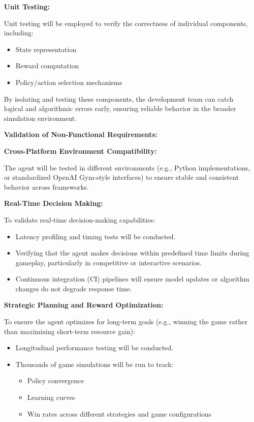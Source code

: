 \documentclass{article}
\begin{document}
\vspace{1em}

\noindent\textbf{Unit Testing:}

Unit testing will be employed to verify the correctness of individual components, including:
\begin{itemize}
    \item State representation
    \item Reward computation
    \item Policy/action selection mechanisms
\end{itemize}

By isolating and testing these components, the development team can catch logical and algorithmic errors early, ensuring reliable behavior in the broader simulation environment.

\noindent\textbf{Validation of Non-Functional Requirements:}

\noindent\textbf{Cross-Platform Environment Compatibility:}

The agent will be tested in different \emph{\Catan{}} environments (e.g., Python implementations, or standardized OpenAI Gym-style interfaces) to ensure stable and consistent behavior across frameworks.

\noindent\textbf{Real-Time Decision Making:}

To validate real-time decision-making capabilities:
\begin{itemize}
    \item Latency profiling and timing tests will be conducted.
    \item Verifying that the agent makes decisions within predefined time limits during gameplay, particularly in competitive or interactive scenarios.
    \item Continuous integration (CI) pipelines will ensure model updates or algorithm changes do not degrade response time.
\end{itemize}

\noindent\textbf{Strategic Planning and Reward Optimization:}

To ensure the \RL{} agent optimizes for long-term goals (e.g., winning the game rather than maximizing short-term resource gain):
\begin{itemize}
    \item Longitudinal performance testing will be conducted.
    \item Thousands of game simulations will be run to track:
    \begin{itemize}
        \item Policy convergence
        \item Learning curves
        \item Win rates across different strategies and game configurations
    \end{itemize}
\end{itemize}
\end{document}
